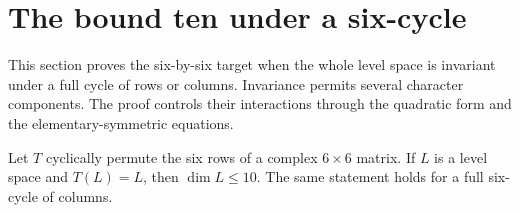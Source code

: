 \section{The bound ten under a six-cycle}
This section proves the six-by-six target when the whole level space is invariant under a full cycle of rows or columns. Invariance permits several character components. The proof controls their interactions through the quadratic form and the elementary-symmetric equations.

\begin{theorem}\label{thm:rowcycle}
Let $T$ cyclically permute the six rows of a complex $6\times6$ matrix. If $L$ is a level space and $T(L)=L$, then $\dim L\leq10$. The same statement holds for a full six-cycle of columns.
\end{theorem}

